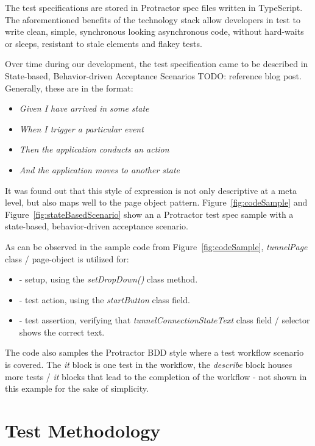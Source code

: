 \documentclass[conference]{IEEEtran}
\newcommand{\todo}[1]{}
\renewcommand{\todo}[1]{{\color{red} TODO: {#1}}}
\begin{document}
	The test specifications are stored in Protractor spec files written in TypeScript. 
	The aforementioned benefits of the technology stack allow developers in test to write clean, simple, synchronous looking asynchronous code, without hard-waits or sleeps, resistant to stale elements and flakey tests.

	Over time during our development, the test specification came to be described in State-based, Behavior-driven Acceptance Scenarios \todo{reference blog post}. 
	Generally, these are in the format:


	\begin{itemize}
		\item [] \textit{Given I have arrived in some state} 
		\item [] \textit{When I trigger a particular event} 
		\item [] \textit{Then the application conducts an action}
		\item [] \textit{And the application moves to another state}
	\end{itemize}

	It was found out that this style of expression is not only descriptive at a meta level, but also maps well to the page object pattern.
	Figure~\ref{fig:codeSample} and Figure~\ref{fig:stateBasedScenario} show an a Protractor test spec sample with a state-based, behavior-driven acceptance scenario.
	
	As can be observed in the sample code from Figure~\ref{fig:codeSample}, \textit{tunnelPage} class / page-object is utilized for:
	
	\begin{itemize}
		\item [] - setup, using the \textit{setDropDown()} class method. 
		\item [] - test action, using the \textit{startButton} class field.
		\item [] - test assertion, verifying that \textit{tunnelConnectionStateText} class field / selector shows the correct text.
	\end{itemize}

	The code also samples the Protractor BDD style where a test workflow scenario is covered. 
	The \textit{it} block is one test in the workflow, the \textit{describe} block houses more tests / \textit{it} blocks that lead to the completion of the workflow - not shown in this example for the sake of simplicity.
	
\section{Test Methodology}
	
\end{document}
